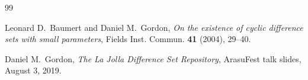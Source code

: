 \documentclass[11pt]{amsart}
\begin{document}
\begin{thebibliography}{99}

Leonard D.~Baumert and Daniel M.~Gordon,
\emph{On the existence of cyclic difference sets with small parameters},
Fields Inst. Commun. \textbf{41} (2004), 29--40.

Daniel M.~Gordon,
\emph{The La Jolla Difference Set Repository},
ArasuFest talk slides, August 3, 2019.

\end{thebibliography}
\end{document}
